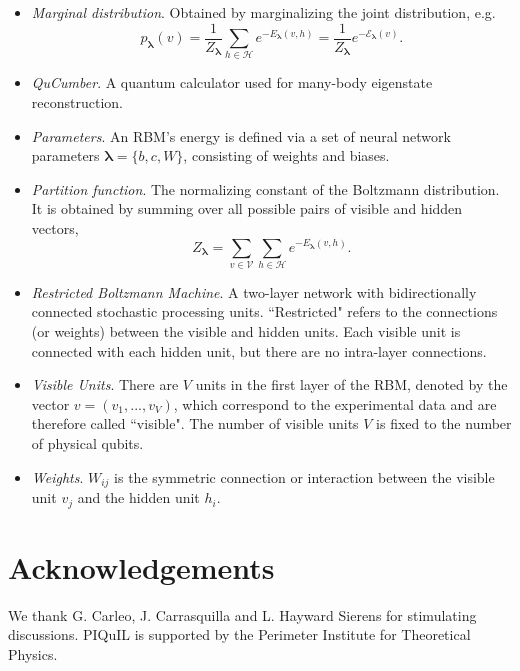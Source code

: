 \documentclass[submission, Phys]{SciPost}
\begin{document}
\begin{itemize}
\item {\it Marginal distribution}.  Obtained by marginalizing the joint distribution, e.g.
\begin{equation}
\label{Eq:marginal_distribution}
    p_{\bm{\lambda}}(v) = \frac{1}{Z_{\bm{\lambda}}} \sum\limits_{h\in \mathcal{H}} e^{-E_{\bm{\lambda}}(v,h)} = \frac{1}{Z_{\bm{\lambda}}} e^{- \mathcal{E}_{\bm{\lambda}}(v)}.
\end{equation}

\item {\it QuCumber}. A quantum calculator used for many-body eigenstate reconstruction.

\item {\it Parameters}.  An RBM's energy is defined via a set of neural network parameters $\bm{\lambda} = \{b,c,W\}$, consisting of weights and biases.

\item {\it Partition function}. The normalizing constant of the Boltzmann distribution.  It is obtained by summing over all possible pairs of visible and hidden vectors,
\begin{equation}
    Z_{\bm{\lambda}} = \sum\limits_{v\in \mathcal{V}}\sum\limits_{h\in \mathcal{H}} e^{-E_{\bm{\lambda}}(v,h)}.
\end{equation}

\item {\it Restricted Boltzmann Machine}.  A two-layer network with bidirectionally connected stochastic processing units.  ``Restricted" refers to the connections (or weights) between the visible and hidden units. Each visible unit is connected with each hidden unit, but there are no intra-layer connections.

\item {\it Visible Units}.  There are $V$ units in the first layer of the RBM, denoted by the vector $v=(v_1, ..., v_V)$, which correspond to the experimental data and are therefore called ``visible".  The number of visible units $V$ is fixed to the number of physical qubits.

\item {\it Weights}.  $W_{ij}$ is the symmetric connection or interaction between the visible unit $v_j$ and the hidden unit $h_i$.

\end{itemize}


\section*{Acknowledgements}
We thank G. Carleo, J. Carrasquilla and L. Hayward Sierens for stimulating discussions.  PIQuIL is supported by the Perimeter Institute for Theoretical Physics.
\end{document}
